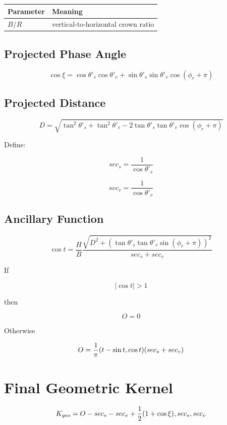 \documentclass[
  letterpaper,
]{scrbook}
\begin{document}
\begin{longtable}[]{@{}ll@{}}
\toprule\noalign{}
Parameter & Meaning \\
\midrule\noalign{}
\endhead
\bottomrule\noalign{}
\endlastfoot
\(B/R\) & vertical-to-horizontal crown ratio \\
\end{longtable}

\subsection{Projected Phase Angle}\label{projected-phase-angle}

\[
\cos\xi =
\cos\theta'_s\cos\theta'_v +
\sin\theta'_s\sin\theta'_v\cos(\phi_r+\pi)
\]

\subsection{Projected Distance}\label{projected-distance}

\[
D =
\sqrt{
\tan^2\theta'_s +
\tan^2\theta'_v -
2\tan\theta'_s\tan\theta'_v\cos(\phi_r+\pi)
}
\]

Define:

\[
sec_s = \frac{1}{\cos\theta'_s}
\]

\[
sec_v = \frac{1}{\cos\theta'_v}
\]

\subsection{\texorpdfstring{Ancillary Function
}{Ancillary Function }}\label{ancillary-function}

\[
\cos t =
\frac{H}{B}\frac{
\sqrt{
D^2 + (\tan\theta'_s\tan\theta'_v\sin(\phi_r+\pi))^2
}}
{sec_s + sec_v}
\]

If

\[
|\cos t| > 1
\]

then

\[
O = 0
\]

Otherwise

\[
O =
\frac{1}{\pi}(t - \sin t \\, \cos t)
(sec_s + sec_v)
\]

\section{Final Geometric Kernel}\label{final-geometric-kernel}

\[
K_{geo} = O - sec_s - sec_v + \frac{1}{2}(1+\cos\xi) \\, sec_s \\,  sec_v
\]
\end{document}
